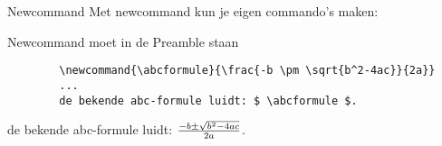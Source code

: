 \begin{frame}[fragile]{Newcommand}
    Met newcommand kun je eigen commando's maken:\\
    \texttt{\newcommand{\COMMANDONAAM}{DEFINITIE}}

    Newcommand moet in de Preamble staan
    \begin{verbatim}
        \newcommand{\abcformule}{\frac{-b \pm \sqrt{b^2-4ac}}{2a}}
        ...
        de bekende abc-formule luidt: $ \abcformule $.
    \end{verbatim}
    \begin{tcolorbox}
        de bekende abc-formule luidt: $ \abcformule $.
    \end{tcolorbox}
    

\end{frame}